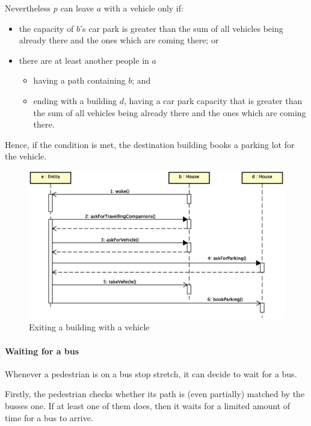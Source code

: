 Nevertheless $p$ can leave $a$ with a vehicle only if:
\begin{itemize}
  \item the capacity of $b$'s car park is greater than the sum of all 
vehicles being already there and the ones which are coming there; or
  \item there are at least another people in $a$ 
  \begin{itemize}
    \item having a path containing $b$; and
    \item ending with a building $d$, having a car park capacity 
    that is greater than 
	the sum of all vehicles being already there and the ones 
	which are coming there.
  \end{itemize}
\end{itemize}
Hence, if the condition is met, the destination building books 
a parking lot for the vehicle.

\begin{figure}[H]
  \centering
  \includegraphics[width=\columnwidth,trim=1 0 0 0,clip]
    {images/solution/going_out_with_vehicle.eps}
  \caption{Exiting a building with a vehicle}
  \label{fig:app-inter-vehicle}
\end{figure}

\paragraph{Waiting for a bus} 
Whenever a pedestrian is on a bus stop stretch, 
it can decide to wait for a bus.

Firstly, the pedestrian checks whether its path is (even partially) 
matched by the busses one.
If at least one of them does, then it waits 
for a limited amount of time for a bus to arrive.

